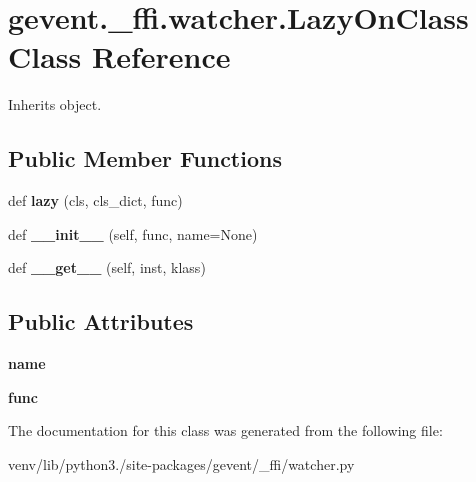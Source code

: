 \hypertarget{classgevent_1_1__ffi_1_1watcher_1_1_lazy_on_class}{}\section{gevent.\+\_\+ffi.\+watcher.\+Lazy\+On\+Class Class Reference}
\label{classgevent_1_1__ffi_1_1watcher_1_1_lazy_on_class}


Inherits object.

\subsection*{Public Member Functions}
\begin{DoxyCompactItemize}
\item 
\mbox{\label{classgevent_1_1__ffi_1_1watcher_1_1_lazy_on_class_a364fb7a12845fbf6de3f11dad96f6de6}} 
def {\bfseries lazy} (cls, cls\+\_\+dict, func)
\item 
\mbox{\label{classgevent_1_1__ffi_1_1watcher_1_1_lazy_on_class_a9bea38fc7cba89eea336b7012a0fd568}} 
def {\bfseries \+\_\+\+\_\+init\+\_\+\+\_\+} (self, func, name=None)
\item 
\mbox{\label{classgevent_1_1__ffi_1_1watcher_1_1_lazy_on_class_a9e9e3f11c979cedac0741ba687af7dac}} 
def {\bfseries \+\_\+\+\_\+get\+\_\+\+\_\+} (self, inst, klass)
\end{DoxyCompactItemize}
\subsection*{Public Attributes}
\begin{DoxyCompactItemize}
\item 
\mbox{\label{classgevent_1_1__ffi_1_1watcher_1_1_lazy_on_class_a27b488a7cffd40da15f8c11526200f7c}} 
{\bfseries name}
\item 
\mbox{\label{classgevent_1_1__ffi_1_1watcher_1_1_lazy_on_class_a1e8a3905fdeecebbf3f6a11592fd1696}} 
{\bfseries func}
\end{DoxyCompactItemize}


The documentation for this class was generated from the following file\+:\begin{DoxyCompactItemize}
\item 
venv/lib/python3./site-\/packages/gevent/\+\_\+ffi/watcher.\+py\end{DoxyCompactItemize}

